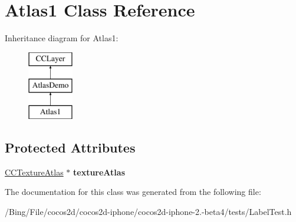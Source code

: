 \hypertarget{interface_atlas1}{\section{Atlas1 Class Reference}
\label{interface_atlas1}
}
Inheritance diagram for Atlas1\-:\begin{figure}[H]
\begin{center}
\leavevmode
\includegraphics[height=3.000000cm]{interface_atlas1}
\end{center}
\end{figure}
\subsection*{Protected Attributes}
\begin{DoxyCompactItemize}
\item 
\hypertarget{interface_atlas1_af0f43d926063310e85bd7d2f7863c27e}{\hyperlink{interface_c_c_texture_atlas}{C\-C\-Texture\-Atlas} $\ast$ {\bfseries texture\-Atlas}}\label{interface_atlas1_af0f43d926063310e85bd7d2f7863c27e}

\end{DoxyCompactItemize}


The documentation for this class was generated from the following file\-:\begin{DoxyCompactItemize}
\item 
/\-Bing/\-File/cocos2d/cocos2d-\/iphone/cocos2d-\/iphone-\/2.-\/beta4/tests/Label\-Test.\-h\end{DoxyCompactItemize}

